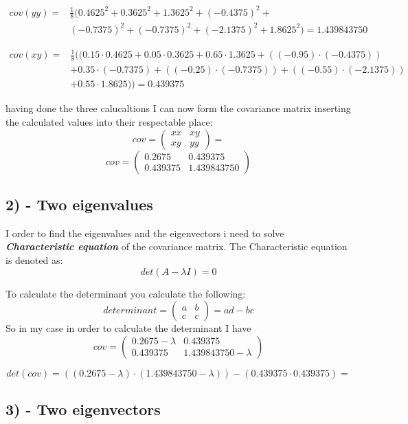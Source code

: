 \begin{equation}
    \begin{split}
        cov(yy) = & \frac{1}{8} \Big(0.4625^2 + 0.3625^2 + 1.3625^2 + (-0.4375)^2 + \\
                  &(-0.7375)^2 + (-0.7375)^2 + (-2.1375)^2 + 1.8625^2 \Big) = 1.439843750
    \end{split}
\end{equation}

\begin{equation}
    \begin{split}
        cov(xy) = & \frac{1}{8} \Big( (0.15\cdot 0.4625 + 0.05 \cdot 0.3625 + 0.65 \cdot  1.3625 + ((-0.95)\cdot (-0.4375))\\
                  &  + 0.35 \cdot (-0.7375) + ((-0.25)\cdot (-0.7375)) + ((-0.55)\cdot (-2.1375))\\
                  &  + 0.55 \cdot 1.8625) \Big) = 0.439375
    \end{split}
\end{equation}

having done the three calucaltions I can now form the covariance matrix inserting the calculated
values into their respectable place:
$$
cov = \begin{pmatrix}
    xx & xy \\
    xy & yy
 \end{pmatrix}
 = 
$$
$$ cov = \begin{pmatrix}
            0.2675 & 0.439375 \\
            0.439375 & 1.439843750
         \end{pmatrix}$$


\subsection{2) - Two eigenvalues}
I order to find the eigenvalues and the eigenvectors i need to solve \textbf{\textit{Characteristic equation}} of the
covariance matrix.
The Characteristic equation is denoted as: 
$$det(A - \lambda I) = 0$$

To calculate the determinant you calculate the following:
$$
determinant = \begin{pmatrix}
                a & b \\
                c & c
              \end{pmatrix}
= ad - bc
$$
So in my case in order to calculate the determinant I have
$$ cov = \begin{pmatrix}
    0.2675 - \lambda & 0.439375 \\
    0.439375 & 1.439843750 - \lambda
 \end{pmatrix}$$

$$det(cov) = ((0.2675 - \lambda) \cdot (1.439843750 - \lambda)) - (0.439375 \cdot 0.439375) = $$
\subsection{3) - Two eigenvectors}
